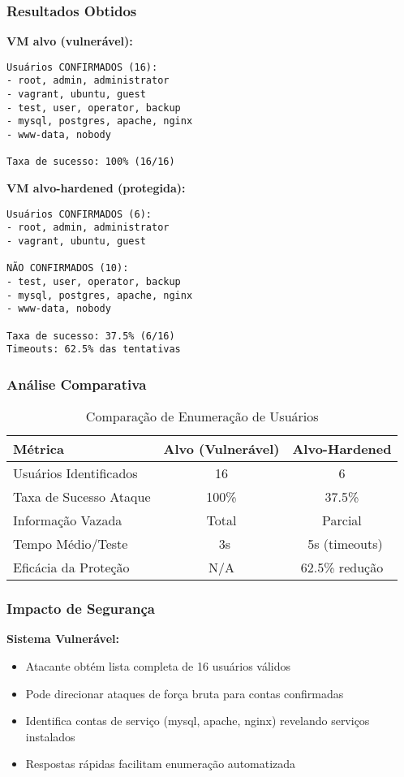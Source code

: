 \documentclass[12pt]{article}
\begin{document}
\subsubsection{Resultados Obtidos}

\textbf{VM alvo (vulnerável):}
\begin{verbatim}
Usuários CONFIRMADOS (16):
- root, admin, administrator
- vagrant, ubuntu, guest
- test, user, operator, backup
- mysql, postgres, apache, nginx
- www-data, nobody

Taxa de sucesso: 100% (16/16)
\end{verbatim}

\textbf{VM alvo-hardened (protegida):}
\begin{verbatim}
Usuários CONFIRMADOS (6):
- root, admin, administrator
- vagrant, ubuntu, guest

NÃO CONFIRMADOS (10):
- test, user, operator, backup
- mysql, postgres, apache, nginx
- www-data, nobody

Taxa de sucesso: 37.5% (6/16)
Timeouts: 62.5% das tentativas
\end{verbatim}

\subsubsection{Análise Comparativa}

\begin{table}[h]
\centering
\begin{tabular}{|l|c|c|}
\hline
\textbf{Métrica} & \textbf{Alvo (Vulnerável)} & \textbf{Alvo-Hardened} \\ \hline
Usuários Identificados & 16 & 6 \\ \hline
Taxa de Sucesso Ataque & 100\% & 37.5\% \\ \hline
Informação Vazada & Total & Parcial \\ \hline
Tempo Médio/Teste & ~3s & ~5s (timeouts) \\ \hline
Eficácia da Proteção & N/A & 62.5\% redução \\ \hline
\end{tabular}
\caption{Comparação de Enumeração de Usuários}
\end{table}

\subsubsection{Impacto de Segurança}

\textbf{Sistema Vulnerável:}
\begin{itemize}
    \item Atacante obtém lista completa de 16 usuários válidos
    \item Pode direcionar ataques de força bruta para contas confirmadas
    \item Identifica contas de serviço (mysql, apache, nginx) revelando serviços instalados
    \item Respostas rápidas facilitam enumeração automatizada
\end{itemize}
\end{document}
